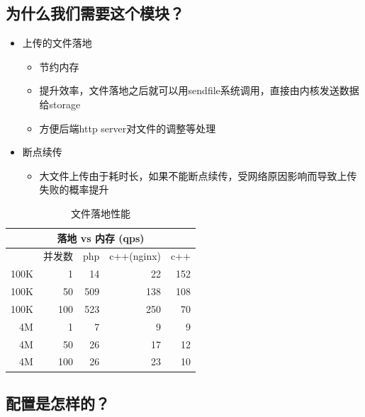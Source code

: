 \documentclass[aspectratio=169]{ctexbeamer}
\begin{document}
\subsection{为什么我们需要这个模块？}
\begin{frame}{\subsecname}
  \begin{itemize}
  \item<2-> 上传的文件落地
    \begin{itemize}
    \item<3-> 节约内存
    \item<4-> 提升效率，文件落地之后就可以用sendfile系统调用，直接由内核发送数据给storage
    \item<5-> 方便后端http server对文件的调整等处理
    \end{itemize}
  \item<6-> 断点续传
    \begin{itemize}
    \item<7-> 大文件上传由于耗时长，如果不能断点续传，受网络原因影响而导致上传失败的概率提升
    \end{itemize}
  \end{itemize}
\end{frame}

\begin{frame}{\subsecname}
  \begin{table}[h]                           
    \centering
    \begin{tabular}{ r|r|r|r|r }
      \multicolumn{5}{c}{\textbf{落地 vs 内存 (qps)}} \\ \hline
           & 并发数  &   php  & c++(nginx) & c++   \\            
      100K &  1     &    14  & 22  & 152       \\     
      100K &  50    &    509 & 138 & 108          \\     
      100K &  100   &    523 & 250 & 70         \\     
      4M &  1     &    7 & 9 & 9           \\     
      4M &  50    &    26 & 17 & 12           \\     
      4M &  100   &    26 & 23 & 10          \\     
    \end{tabular}
    \caption{文件落地性能}
    \label{tab:msg1}                            
  \end{table}
\end{frame}

\subsection{配置是怎样的？}
\begin{frame}{\subsecname}
  
\end{frame}
\end{document}
